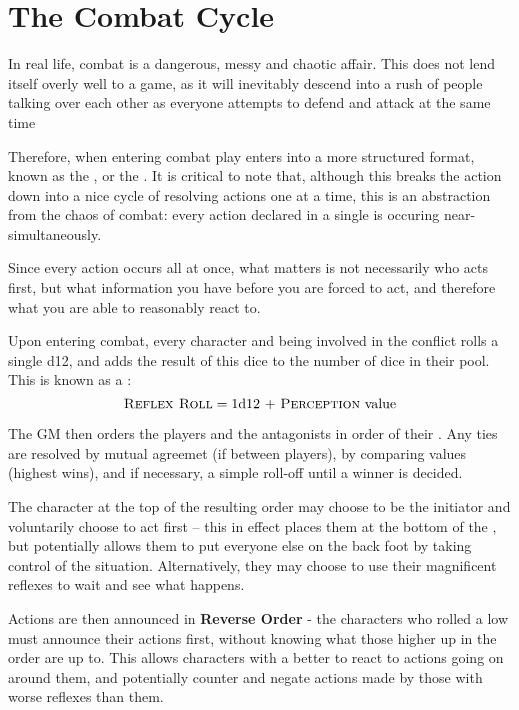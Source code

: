 

\section{The Combat Cycle}

In real life, combat is a dangerous, messy and chaotic affair. This does not lend itself overly well to a game, as it will inevitably descend into a rush of people talking over each other as everyone attempts to defend and attack at the same time 

Therefore, when entering combat play enters into a more structured format, known as the , or the . It is critical to note that, although this breaks the action down into a nice cycle of resolving actions one at a time, this is an abstraction from the chaos of combat: every action declared in a single  is occuring near-simultaneously.

Since every action occurs all at once, what matters is not necessarily who acts first, but what information you have before you are forced to act, and therefore what you are able to reasonably react to.

Upon entering combat, every character and being involved in the conflict rolls a single d12, and adds the result of this dice to the number of dice in their  pool. This is known as a :
$$ \text{\textsc{Reflex Roll}} = \text{1d12 + \textsc{Perception} value} $$

The GM then orders the players and the antagonists in order of their . Any ties are resolved by mutual agreemet (if between players), by comparing  values (highest wins), and if necessary, a simple roll-off until a winner is decided.

The character at the top of the resulting  order may choose to be the initiator and voluntarily choose to act first -- this in effect places them at the bottom of the , but potentially allows them to put everyone else on the back foot by taking control of the situation. Alternatively, they may choose to use their magnificent reflexes to wait and see what happens.

Actions are then announced in {\bf Reverse Order} - the characters who rolled a low  must announce their actions first, without knowing what those higher up in the order are up to. This allows characters with a better  to react to actions going on around them, and potentially counter and negate actions made by those with worse reflexes than them.  

